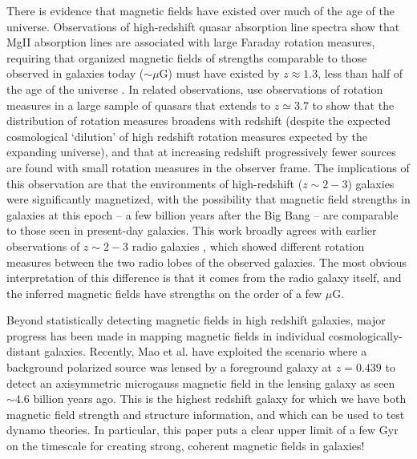 There is evidence that magnetic fields have existed
over much of the age of the universe.  Observations of high-redshift
quasar absorption line spectra show that MgII absorption lines are
associated with large Faraday rotation measures, requiring that
organized magnetic fields of strengths comparable to those observed in
galaxies today ($\sim \mu$G) must have existed by $z \approx 1.3$,
less than half of the age of the universe \cite{2008Natur.454..302B, Joshi13,
Farnes14}.  In related observations, \cite{2008ApJ...676...70K} use
observations of rotation measures in a large sample of quasars that
extends to $z \simeq 3.7$ to show that the distribution of rotation
measures broadens with redshift (despite the expected cosmological
`dilution' of high redshift rotation measures expected by the
expanding universe), and that at increasing redshift progressively
fewer sources are found with small rotation measures in the observer
frame.  The implications of this observation are that the environments
of high-redshift ($z \sim 2-3$) galaxies were significantly
magnetized, with the possibility that magnetic field strengths in
galaxies at this epoch -- a few billion years after the Big Bang --
are comparable to those seen in present-day galaxies.  This work
broadly agrees with earlier observations of $z \sim 2-3$ radio
galaxies \cite{1998A&A...329..809A}, which showed different
rotation measures between the two radio lobes of the observed
galaxies.  The most obvious interpretation of this difference is
that it comes from the radio galaxy itself, and the inferred magnetic
fields have strengths on the order of a few $\mu$G.

Beyond statistically detecting magnetic fields in high redshift
galaxies, major progress has been made in mapping magnetic fields in
individual cosmologically-distant galaxies. Recently, Mao et
al. \citep{Mao17} have exploited the scenario where a background
polarized source was lensed by a foreground galaxy at $z=0.439$ to
detect an axisymmetric microgauss magnetic field in the lensing galaxy
as seen $\sim 4.6$ billion years ago.  This is the highest redshift
galaxy for which we have both magnetic field strength and structure
information, and which can be used to test dynamo theories.  In
particular, this paper puts a clear upper limit of a few Gyr on the
timescale for creating strong, coherent magnetic fields in galaxies!



